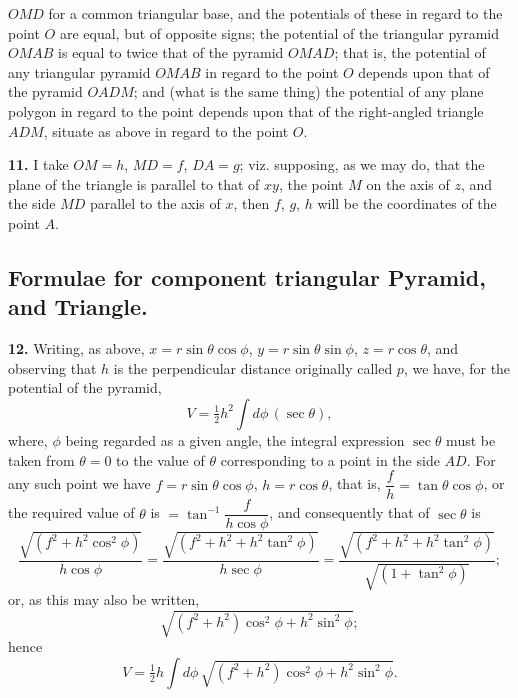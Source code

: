 \documentclass[11pt,a4paper]{book}
\begin{document}
\newpage
\noindent $OMD$ for a common triangular base, and the potentials of these in regard to
the point $O$ are equal, but of opposite signs; the potential of the
triangular pyramid $OMAB$ is equal to twice that of the pyramid $OMAD$; that
is, the potential of any triangular pyramid $OMAB$ in regard to the point $O$
depends upon that of the pyramid $OADM$; and (what is the same thing) the
potential of any plane polygon in regard to the point depends upon that of
the right-angled triangle $ADM$, situate as above in regard to the point $O$.

\smallskip\noindent\textbf{11.}\quad
I take $OM=h$, $MD=f$, $DA=g$; viz. supposing, as we may do, that the plane
of the triangle is parallel to that of $xy$, the point $M$ on the axis of
$z$, and the side $MD$ parallel to the axis of $x$, then $f$, $g$, $h$ will
be the coordinates of the point $A$.

\subsection*{Formulae for component triangular Pyramid, and Triangle.}

\smallskip\noindent\textbf{12.}\quad
Writing, as above, $x=r\sin\theta\cos\phi$, $y=r\sin\theta\sin\phi$,
$z=r\cos\theta$, and observing that $h$ is the perpendicular distance
originally called $p$, we have, for the potential of the pyramid,
\[
V = \tfrac{1}{2}h^2 \int d\phi\,(\sec\theta),
\]
where, $\phi$ being regarded as a given angle, the integral expression
$\sec\theta$ must be taken from $\theta=0$ to the value of $\theta$
corresponding to a point in the side $AD$. For any such point we have
$f=r\sin\theta\cos\phi$, $h=r\cos\theta$, that is, $\dfrac{f}{h}=\tan\theta\cos\phi$,
or the required value of $\theta$ is $=\tan^{-1}\dfrac{f}{h\cos\phi}$, and
consequently that of $\sec\theta$ is
\[
\frac{\sqrt{(f^2+h^2\cos^2\phi)}}{h\cos\phi}
= \frac{\sqrt{(f^2+h^2+h^2\tan^2\phi)}}{h\sec\phi}
= \frac{\sqrt{(f^2+h^2+h^2\tan^2\phi)}}{\sqrt{(1+\tan^2\phi)}};
\]
or, as this may also be written,
\[
\sqrt{(f^2+h^2)\cos^2\phi + h^2\sin^2\phi};
\]
hence
\[
V = \tfrac{1}{2}h \int d\phi\,
    \sqrt{(f^2+h^2)\cos^2\phi + h^2\sin^2\phi}.
\]
\end{document}
